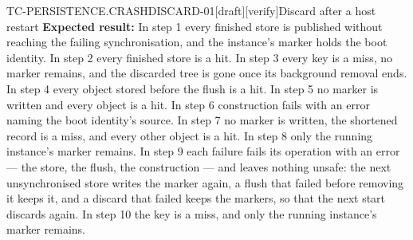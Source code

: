 \begin{requirement}{TC-PERSISTENCE.CRASHDISCARD-01}[draft][verify]{Discard after a host restart}
  \textbf{Expected result:} In step 1 every finished store is published
  without reaching the failing synchronisation, and the instance's marker
  holds the boot identity. In step 2 every finished store is a hit. In step 3
  every key is a miss, no marker remains, and the discarded tree is gone once
  its background removal ends. In step 4 every object stored before the flush
  is a hit. In step 5 no marker is written and every object is a hit. In
  step 6 construction fails with an error naming the boot identity's source.
  In step 7 no marker is written, the shortened record is a miss, and every
  other object is a hit. In step 8 only the running instance's marker
  remains. In step 9 each failure fails its operation with an error --- the
  store, the flush, the construction --- and leaves nothing unsafe: the next
  unsynchronised store writes the marker again, a flush that failed before
  removing it keeps it, and a discard that failed keeps the markers, so that
  the next start discards again. In step 10 the key is a miss, and only the
  running instance's marker remains.



\end{requirement}

